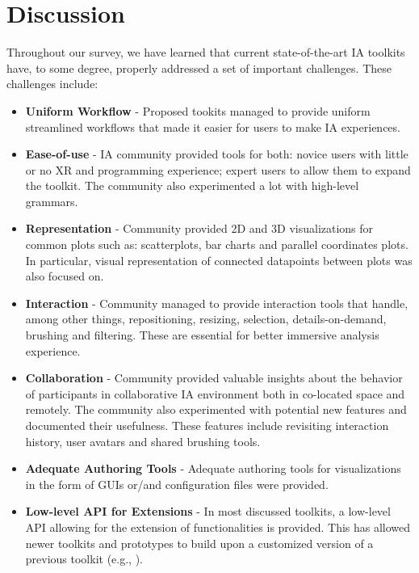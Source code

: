 \documentclass{vgtc}                          %
\begin{document}
\section{Discussion}

Throughout our survey, we have learned that current state-of-the-art IA
toolkits have, to some degree, properly addressed a set of important
challenges. These challenges include:

\begin{itemize}
	\item \textbf{Uniform Workflow} - Proposed tookits managed to provide
	      uniform streamlined workflows that made it easier for users to make
	      IA experiences.
	\item \textbf{Ease-of-use} - IA community provided tools for both: novice
	      users with little or no XR and programming experience; expert users
	      to allow them to expand the toolkit. The community also experimented
	      a lot with high-level grammars.
	\item \textbf{Representation} - Community provided 2D and 3D visualizations
	      for common plots such as: scatterplots, bar charts and parallel
	      coordinates plots. In particular, visual representation of connected
	      datapoints between plots was also focused on.
	\item \textbf{Interaction} - Community managed to provide interaction tools
	      that handle, among other things, repositioning, resizing, selection,
	      details-on-demand, brushing and filtering. These are essential for
	      better immersive analysis experience.
	\item \textbf{Collaboration} - Community provided valuable insights about
	      the behavior of participants in collaborative IA environment both
	      in co-located space and remotely. The community also experimented
	      with potential new features and documented their usefulness. These
	      features include revisiting interaction history, user avatars and
	      shared brushing tools.
	\item \textbf{Adequate Authoring Tools} - Adequate authoring tools for
	      visualizations in the form of GUIs or/and configuration files were
	      provided.
	\item \textbf{Low-level API for Extensions} - In most discussed toolkits,
	      a low-level API allowing for the extension of functionalities is
	      provided. This has allowed newer toolkits and prototypes to build upon a
          customized version of a previous toolkit
          (e.g., \cite{ragrug_toolkit,fiesta_prototype,hybridaxes_tool}).
\end{itemize}
\end{document}

